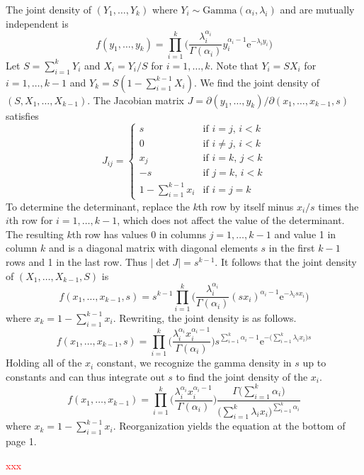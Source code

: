 \documentclass[ba]{imsart}
\numberwithin{equation}{section}
\theoremstyle{plain}
\newcommand{\falta}[1]{\textcolor{red}{#1}}
\begin{document}
The joint density of $(Y_1,\ldots,Y_k)$ where $Y_i \sim \text{Gamma}(\alpha_i,\lambda_i)$ and are mutually independent is
$$
f(y_1,\ldots,y_k) = \prod_{i=1}^k \Bigg( \frac{ \lambda_i^{\alpha_i}}{\Gamma(\alpha_i)} y_i^{\alpha_i-1} \mathrm{e}^{-\lambda_i y_i} \Bigg)
$$
Let $S = \sum_{i=1}^k Y_i$ and $X_i = Y_i / S$ for $i=1,\ldots,k$.
Note that $Y_i = SX_i$ for $i=1,\ldots,k-1$ and $Y_k = S(1 - \sum_{i=1}^{k-1} X_i)$.
We find the joint density of $(S,X_1,\ldots,X_{k-1})$.
The Jacobian matrix $J = \partial(y_1,\ldots,y_k)/\partial(x_1,\ldots,x_{k-1},s)$
satisfies
$$
J_{ij} = \left\{
\begin{array}{ll}
s & \text{if $i=j$, $i<k$} \\
0 & \text{if $i \neq j$, $i<k$} \\
x_j & \text{if $i=k$, $j<k$} \\
-s & \text{if $j=k$, $i<k$} \\
1 - \sum_{i=1}^{k-1} x_i & \text{if $i=j=k$}
\end{array}
\right.
$$
To determine the determinant,
replace the $k$th row by itself minus $x_i/s$ times the $i$th row
for $i=1,\ldots,k-1$,
which does not affect the value of the determinant.
The resulting $k$th row has values 0 in columns $j=1,\ldots,k-1$ and value 1
in column $k$ and is a diagonal matrix with diagonal elements $s$ in the first $k-1$ rows and 1 in the last row.
Thus $|\det J| = s^{k-1}$.
It follows that the joint density of $(X_1,\ldots,X_{k-1},S)$ is
$$
f(x_1,\ldots,x_{k-1},s) = s^{k-1} \prod_{i=1}^k \Bigg( \frac{ \lambda_i^{\alpha_i}}{\Gamma(\alpha_i)} (sx_i)^{\alpha_i-1} \mathrm{e}^{-\lambda_i sx_i} \Bigg)
$$
where $x_k = 1 - \sum_{i=1}^{k-1} x_i$.
Rewriting, the joint density is as follows.
$$
f(x_1,\ldots,x_{k-1},s) =  \prod_{i=1}^k \Bigg( \frac{ \lambda_i^{\alpha_i}x_i^{\alpha_i-1}}{\Gamma(\alpha_i)} \Bigg)
s^{\sum_{i=1}^k \alpha_i-1} \mathrm{e}^{-\big(\sum_{i=1}^k \lambda_ix_i\big)s}
$$
Holding all of the $x_i$ constant,
we recognize the gamma density in $s$
up to constants and can thus integrate out $s$ to find the joint density of the $x_i$.
$$
f(x_1,\ldots,x_{k-1}) = \prod_{i=1}^k \Bigg( \frac{ \lambda_i^{\alpha_i}x_i^{\alpha_i-1}}{\Gamma(\alpha_i)} \Bigg) \frac{\Gamma\big(\sum_{i=1}^k \alpha_i\big)}{\big(\sum_{i=1}^k \lambda_i x_i\big)^{\sum_{i=1}^k \alpha_i}}
$$
where $x_k = 1 - \sum_{i=1}^{k-1} x_i$.
Reorganization yields the equation at the bottom of page 1.




\begin{acknowledgement}
\falta{xxx}
\end{acknowledgement}
\end{document}
